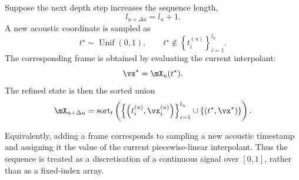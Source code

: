 Suppose the next depth step increases the sequence length,
\[
l_{u+\Delta u} = l_u + 1.
\]
A new acoustic coordinate is sampled as
\[
t^\star \sim \operatorname{Unif}(0,1),
\qquad
t^\star \notin
\left\{
t_i^{(u)}
\right\}_{i=1}^{l_u}.
\]
The corresponding frame is obtained by evaluating the current interpolant:
\[
\vx^\star
=
\mX_u(t^\star).
\]
The refined state is then the sorted union
\[
\mX_{u+\Delta u}
=
\operatorname{sort}_{t}
\left(
\left\{
\left(t_i^{(u)}, \vx_i^{(u)}\right)
\right\}_{i=1}^{l_u}
\cup
\left\{
\left(t^\star, \vx^\star\right)
\right\}
\right).
\]

Equivalently, adding a frame corresponds to sampling a new acoustic
timestamp and assigning it the value of the current piecewise-linear
interpolant. Thus the sequence is treated as a discretisation of a
continuous signal over $[0,1]$, rather than as a fixed-index array.

